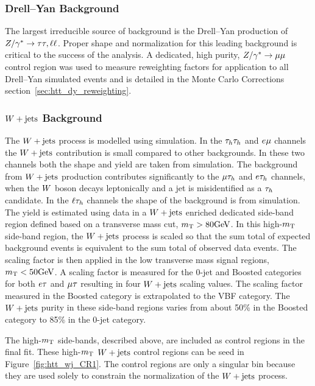 \subsubsection{Drell--Yan Background}
The largest irreducible source of background is the Drell--Yan production
of $Z/\gamma^*\to\tau\tau, \ell\ell$. Proper shape and normalization for this
leading background is critical to the success of the analysis.
A dedicated, high purity, $Z/\gamma^*\to\mu\mu$ control region was
used to measure reweighting factors for application to all Drell--Yan
simulated events and is detailed in the Monte Carlo Corrections 
section~\ref{sec:htt_dy_reweighting}.

\subsubsection{$W+\text{jets}$ Background}
The $W+\text{jets}$ process is modelled using simulation.
In the $\tau_{h}\tau_{h}$ and $e\mu$ channels the $W+\text{jets}$ contribution 
is small compared to other backgrounds. In these two channels both the shape and 
yield are taken from simulation.
The background from $W+\text{jets}$ production contributes significantly to the
$\mu\tau_{h}$ and $e\tau_{h}$ channels, when the $W$ boson decays leptonically and
a jet is misidentified as a $\tau_{h}$ candidate. In the $\ell\tau_{h}$ channels
the shape of the background is from simulation. The yield is estimated 
using data in a $W+\text{jets}$ enriched dedicated side-band region defined
based on a transverse mass cut, $m_\mathrm{T} > 80\mathrm{GeV}$. In this high-$m_\mathrm{T}$ side-band region, the $W+\text{jets}$
process is scaled so that the sum total of expected background events is equivalent
to the sum total of observed data events. The scaling factor is then applied
in the low transverse mass signal regions, $m_\mathrm{T} < 50\mathrm{GeV}$. A scaling factor
is measured for the 0-jet and Boosted categories for both $e\tau$ and $\mu\tau$ resulting
in four $W+\text{jets}$ scaling values. The scaling factor measured in the Boosted
category is extrapolated to the VBF category. The $W+\text{jets}$ purity in these
side-band regions varies from about 50\% in the Boosted category to 85\% in the 0-jet category.

The high-$m_\mathrm{T}$ side-bands, described above, are included as control regions in the final fit.
These high-$m_\mathrm{T}$ $W+\text{jets}$ control regions can be seed in Figure~\ref{fig:htt_wj_CR1}.
The control regions are only a singular bin because they are used solely to constrain 
the normalization of the $W+\text{jets}$ process.

